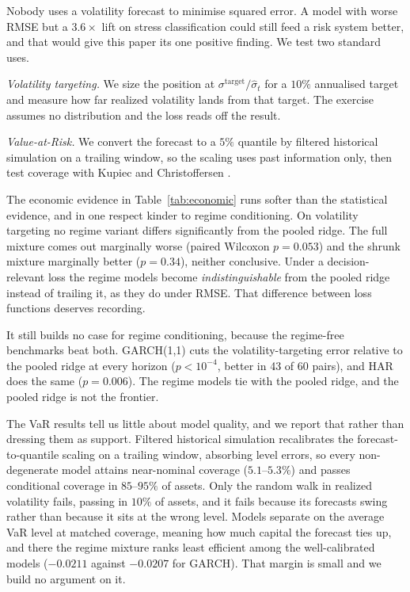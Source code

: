 \documentclass[sigconf,nonacm]{acmart}
\begin{document}


Nobody uses a volatility forecast to minimise squared error. A model with worse
RMSE but a $3.6\times$ lift on stress classification could still feed a risk
system better, and that would give this paper its one positive finding. We test
two standard uses.

\emph{Volatility targeting.} We size the position at
$\sigma^{\text{target}}/\hat\sigma_t$ for a $10\%$ annualised target
\cite{moreira2017} and measure how far realized volatility lands from that
target. The exercise assumes no distribution and the loss reads off the result.

\emph{Value-at-Risk.} We convert the forecast to a $5\%$ quantile by filtered
historical simulation on a trailing window, so the scaling uses past information
only, then test coverage with Kupiec \cite{kupiec1995} and Christoffersen
\cite{christoffersen1998}.

The economic evidence in Table~\ref{tab:economic} runs softer than the
statistical evidence, and in one respect kinder to regime conditioning. On
volatility targeting no regime variant differs significantly from the pooled
ridge. The full mixture comes out marginally worse (paired Wilcoxon $p = 0.053$)
and the shrunk mixture marginally better ($p = 0.34$), neither conclusive. Under
a decision-relevant loss the regime models become \emph{indistinguishable} from
the pooled ridge instead of trailing it, as they do under RMSE. That difference
between loss functions deserves recording.

It still builds no case for regime conditioning, because the regime-free
benchmarks beat both. GARCH(1,1) cuts the volatility-targeting error relative to
the pooled ridge at every horizon ($p < 10^{-4}$, better in 43 of 60 pairs), and
HAR does the same ($p = 0.006$). The regime models tie with the pooled ridge, and
the pooled ridge is not the frontier.

The VaR results tell us little about model quality, and we report that rather
than dressing them as support. Filtered historical simulation recalibrates the
forecast-to-quantile scaling on a trailing window, absorbing level errors, so
every non-degenerate model attains near-nominal coverage ($5.1$--$5.3\%$) and
passes conditional coverage in $85$--$95\%$ of assets. Only the random walk in
realized volatility fails, passing in $10\%$ of assets, and it fails because its
forecasts swing rather than because it sits at the wrong level. Models separate
on the average VaR level at matched coverage, meaning how much capital the
forecast ties up, and there the regime mixture ranks least efficient among the
well-calibrated models ($-0.0211$ against $-0.0207$ for GARCH). That margin is
small and we build no argument on it.




\end{document}
